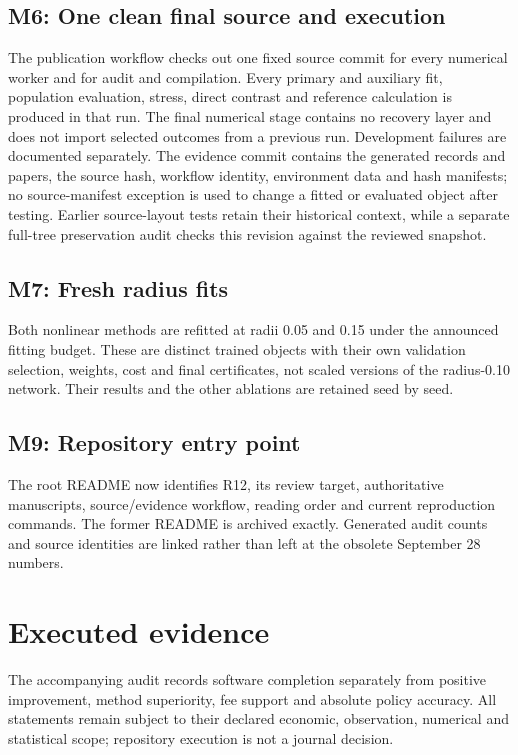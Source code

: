 \subsection*{M6: One clean final source and execution}
The publication workflow checks out one fixed source commit for every numerical worker and for audit and compilation. Every primary and auxiliary fit, population evaluation, stress, direct contrast and reference calculation is produced in that run. The final numerical stage contains no recovery layer and does not import selected outcomes from a previous run. Development failures are documented separately. The evidence commit contains the generated records and papers, the source hash, workflow identity, environment data and hash manifests; no source-manifest exception is used to change a fitted or evaluated object after testing. Earlier source-layout tests retain their historical context, while a separate full-tree preservation audit checks this revision against the reviewed snapshot.

\subsection*{M7: Fresh radius fits}
Both nonlinear methods are refitted at radii 0.05 and 0.15 under the announced fitting budget. These are distinct trained objects with their own validation selection, weights, cost and final certificates, not scaled versions of the radius-0.10 network. Their results and the other ablations are retained seed by seed.

\subsection*{M9: Repository entry point}
The root README now identifies R12, its review target, authoritative manuscripts, source/evidence workflow, reading order and current reproduction commands. The former README is archived exactly. Generated audit counts and source identities are linked rather than left at the obsolete September 28 numbers.

\section*{Executed evidence}

The accompanying audit records software completion separately from positive improvement, method superiority, fee support and absolute policy accuracy. All statements remain subject to their declared economic, observation, numerical and statistical scope; repository execution is not a journal decision.
